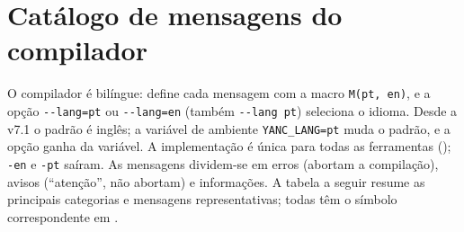 \section{Catálogo de mensagens do compilador}
\label{sec:cmm-mensagens}

O compilador é bilíngue:  define cada mensagem com a macro
\lstinline|M(pt, en)|, e a opção \lstinline|--lang=pt| ou \lstinline|--lang=en| (também
\lstinline|--lang pt|) seleciona o idioma. Desde a v7.1 o padrão é inglês; a variável
de ambiente \lstinline|YANC_LANG=pt| muda o padrão, e a opção ganha da variável. A
implementação é única para todas as ferramentas ();
\lstinline|-en| e \lstinline|-pt| saíram. As mensagens dividem-se em erros
(abortam a compilação), avisos (\enquote{atenção}, não abortam) e informações.
A tabela a seguir resume as principais categorias e mensagens representativas;
todas têm o símbolo correspondente em .

